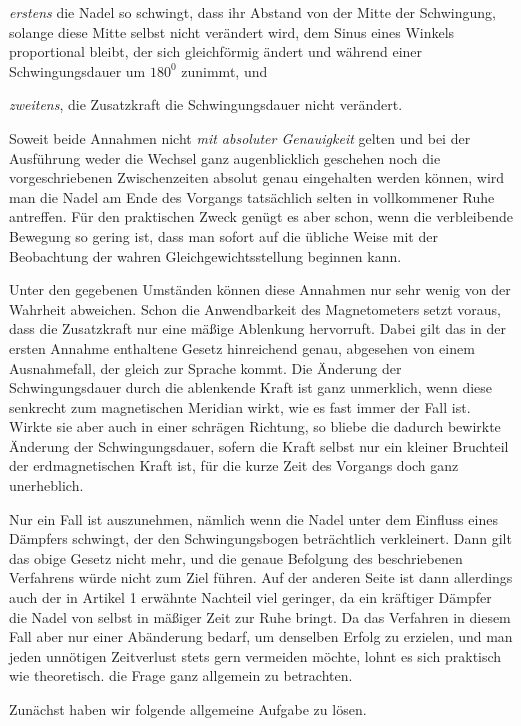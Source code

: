 \textit{erstens} die Nadel so schwingt, dass ihr Abstand von der Mitte der Schwingung, solange diese Mitte selbst nicht verändert wird, dem Sinus eines Winkels proportional bleibt, der sich gleichförmig ändert und während einer Schwingungsdauer um $180^0$ zunimmt, und

\textit{zweitens}, die Zusatzkraft die Schwingungsdauer nicht verändert.

Soweit beide Annahmen nicht \textit{mit absoluter Genauigkeit} gelten und bei der Ausführung weder die Wechsel ganz augenblicklich geschehen noch die vorgeschriebenen Zwischenzeiten absolut genau eingehalten werden können, wird man die Nadel am Ende des Vorgangs tatsächlich selten in vollkommener Ruhe antreffen. Für den praktischen Zweck genügt es aber schon, wenn die verbleibende Bewegung so gering ist, dass man sofort auf die übliche Weise mit der Beobachtung der wahren Gleichgewichtsstellung beginnen kann.

Unter den gegebenen Umständen können diese Annahmen nur sehr wenig von der Wahrheit abweichen. Schon die Anwendbarkeit des Magnetometers setzt voraus, dass die Zusatzkraft nur eine mäßige Ablenkung hervorruft. Dabei gilt das in der ersten Annahme enthaltene Gesetz hinreichend genau, abgesehen von einem Ausnahmefall, der gleich zur Sprache kommt. Die Änderung der Schwingungsdauer durch die ablenkende Kraft ist ganz unmerklich, wenn diese senkrecht zum magnetischen Meridian wirkt, wie es fast immer der Fall ist. Wirkte sie aber auch in einer schrägen Richtung, so bliebe die dadurch bewirkte Änderung der Schwingungsdauer, sofern die Kraft selbst nur ein kleiner Bruchteil der erdmagnetischen Kraft ist, für die kurze Zeit des Vorgangs doch ganz unerheblich.

Nur ein Fall ist auszunehmen, nämlich wenn die Nadel unter dem Einfluss eines Dämpfers schwingt, der den Schwingungsbogen beträchtlich verkleinert. Dann gilt das obige Gesetz nicht mehr, und die genaue Befolgung des beschriebenen Verfahrens würde nicht zum Ziel führen. Auf der anderen Seite ist dann allerdings auch der
in Artikel 1 erwähnte Nachteil viel geringer, da ein kräftiger Dämpfer die Nadel von selbst in mäßiger Zeit zur Ruhe bringt. Da das Verfahren in diesem Fall aber nur einer Abänderung bedarf, um denselben Erfolg zu erzielen, und man jeden unnötigen Zeitverlust stets gern vermeiden möchte, lohnt es sich praktisch wie theoretisch. die Frage ganz allgemein zu betrachten.

Zunächst haben wir folgende allgemeine Aufgabe zu lösen.

